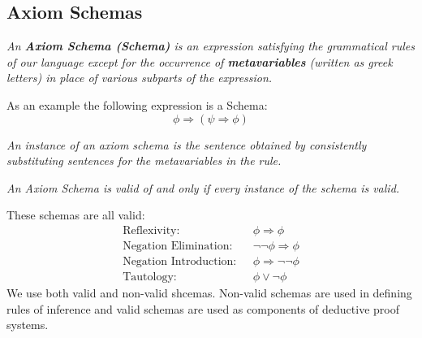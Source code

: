 \documentclass[10pt,a4pape,twocolumn]{article}
\begin{document}
            \subsection{Axiom Schemas}
                \begin{define}
                    \textit{An \textbf{Axiom Schema (Schema)} is an expression satisfying the grammatical rules of our language except for the occurrence of \textbf{metavariables} (written as greek letters) in place of various subparts of the expression.}
                \end{define}
                As an example the following expression is a Schema:
                \begin{equation}
                    \phi\Rightarrow (\psi\Rightarrow\phi)
                \end{equation}
                \begin{define}
                    \textit{An instance of an axiom schema is the sentence obtained by consistently substituting sentences for the metavariables in the rule.}
                \end{define}
                \begin{define} 
                    \textit{An Axiom Schema is valid of and only if every instance of the schema is valid.}
                \end{define}
                These schemas are all valid:
                \begin{align}
                    \text{Reflexivity:} \ \ \ & \phi \Rightarrow\phi \\
                    \text{Negation Elimination:} \ \ \ & \neg\neg\phi\Rightarrow\phi  \\
                    \text{Negation Introduction:} \ \ \ & \phi \Rightarrow \neg\neg\phi \\
                    \text{Tautology:} \ \ \ & \phi \lor \neg\phi 
                \end{align}
                We use both valid and non-valid shcemas. Non-valid schemas are used in defining rules of inference and valid schemas are used as components of deductive proof systems.
\end{document}
